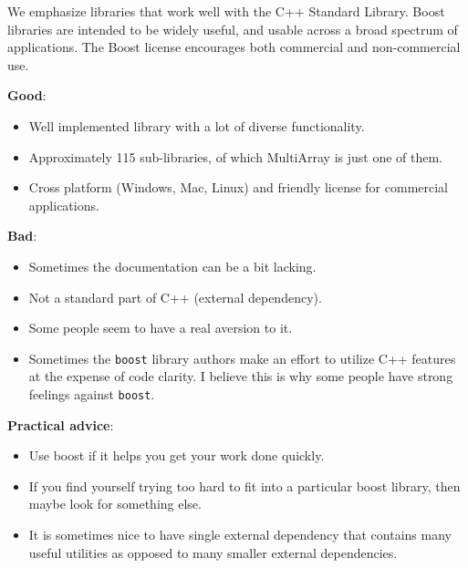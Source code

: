\documentclass[12pt,letterpaper,twoside]{article}
\begin{document}
We emphasize libraries that work well with the C++ Standard Library.
Boost libraries are intended to be widely useful, and usable across a
broad spectrum of applications. The Boost license encourages both
commercial and non-commercial use.

\textbf{Good}:

\begin{itemize}
\item
  Well implemented library with a lot of diverse functionality.
\item
  Approximately 115 sub-libraries, of which MultiArray is just one of
  them.
\item
  Cross platform (Windows, Mac, Linux) and friendly license for
  commercial applications.
\end{itemize}

\textbf{Bad}:

\begin{itemize}
\item
  Sometimes the documentation can be a bit lacking.
\item
  Not a standard part of C++ (external dependency).
\item
  Some people seem to have a real aversion to it.
\item
  Sometimes the \texttt{boost} library authors make an effort to utilize
  C++ features at the expense of code clarity. I believe this is why
  some people have strong feelings against \texttt{boost}.
\end{itemize}

\textbf{Practical advice}:

\begin{itemize}
\item
  Use boost if it helps you get your work done quickly.
\item
  If you find yourself trying too hard to fit into a particular boost
  library, then maybe look for something else.
\item
  It is sometimes nice to have single external dependency that contains
  many useful utilities as opposed to many smaller external
  dependencies.
\end{itemize}
\end{document}

